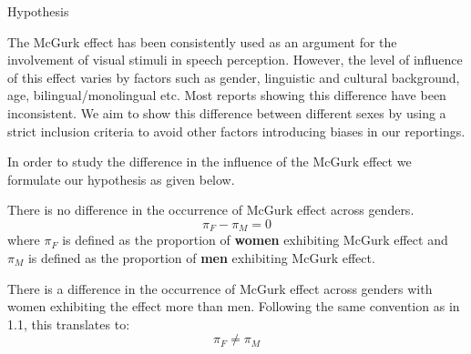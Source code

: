 \documentclass{article}
\begin{document}
\makeheader


\begin{psection}{Hypothesis}

	The McGurk effect has been consistently used as an argument for the involvement of visual stimuli in speech perception. However, the level of influence of this effect varies by factors such as gender, linguistic and cultural background, age, bilingual/monolingual etc. Most reports showing this difference have been inconsistent. We aim to show this difference between different sexes by using a strict inclusion criteria to avoid other factors introducing biases in our reportings.

	In order to study the difference in the influence of the McGurk effect we formulate our hypothesis as given below.

	There is no difference in the occurrence of McGurk effect across genders. 
	\begin{equation}
		\pi_F-\pi_M=0
	\end{equation}
	where $\pi_F$ is defined as the proportion of \textbf{women} exhibiting McGurk effect and $\pi_M$ is defined as the proportion of \textbf{men} exhibiting McGurk effect.

	There is a difference in the occurrence of McGurk effect across genders with women exhibiting the effect more than men.
	Following the same convention as in 1.1, this translates to:
	\begin{equation}
		\pi_F \neq \pi_M
	\end{equation}
\end{psection}
\end{document}
